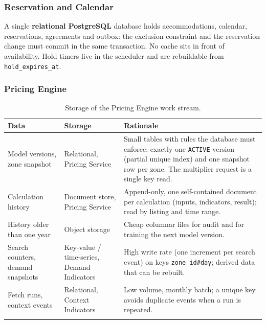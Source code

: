 \subsubsection{Reservation and Calendar }
A single \textbf{relational PostgreSQL} database holds accommodations,
calendar, reservations, agreements and outbox: the exclusion constraint and the
reservation change must commit in the same transaction. No cache sits in front
of availability. Hold timers live in the scheduler and are rebuildable from
\texttt{hold\_expires\_at}.

\begingroup
\setlength{\emergencystretch}{3em}
\subsubsection{Pricing Engine}
\label{sec:price-storage}

\begin{longtable}{@{}L{3.4cm}L{3.2cm}L{7.2cm}@{}}
\toprule
\textbf{Data} & \textbf{Storage} & \textbf{Rationale} \\
\midrule
\endhead
Model versions, zone snapshot & Relational, Pricing Service &
  Small tables with rules the database must enforce: exactly one
  \texttt{ACTIVE} version (partial unique index) and one snapshot row per
  zone. The multiplier request is a single key read. \\
Calculation history & Document store, Pricing Service &
  Append-only, one self-contained document per calculation (inputs,
  indicators, result); read by listing and time range. \\
History older than one year & Object storage &
  Cheap columnar files for audit and for training the next model version. \\
Search counters, demand snapshots & Key-value / time-series, Demand
  Indicators & High write rate (one increment per search event) on keys
  \texttt{zone\_id\#day}; derived data that can be rebuilt. \\
Fetch runs, context events & Relational, Context Indicators &
  Low volume, monthly batch; a unique key avoids duplicate events when a run
  is repeated. \\
\bottomrule
\caption{Storage of the Pricing Engine work stream.}
\label{tab:price-storage}
\end{longtable}
\endgroup

\begingroup
\setlength{\emergencystretch}{3em}
